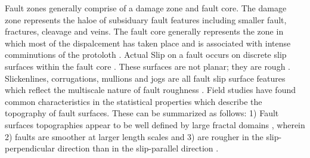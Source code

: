 \documentclass[12pt,a4paper]{article}
\begin{document}
	Fault zones generally comprise of a damage zone and fault core. The damage zone represents the haloe of subsiduary fault features including smaller fault, fractures, cleavage and veins. The fault core generally represents the zone in which most of the dispalcement has taken place and is associated with intense comminutions of the protoloth  \cite{sibson1977fault, chester1986implications, caine1996fault}. Actual Slip on a fault occurs on discrete slip surfaces within the fault core \cite{palmer1973growth, engelder1974cataclasis, aydin1978development, sibson2003thick}. These surfaces are not planar; they are rough \cite{scholz1986fractal}. Slickenlines, corrugations, mullions and jogs are all fault slip surface features which reflect the multiscale nature of fault roughness \cite{scholz1986fractal,sagy2009geometric}. Field studies have found common characteristics in the statistical properties which describe the topography of fault surfaces. These can be summarized as follows: 1) Fault surfaces topographies appear to be well defined by large fractal domains \cite{scholz1986fractal} , wherein 2) faults are smoother at larger length scales  \cite{schmittbuhl1993field, andela2012roughness} and 3) are rougher in the slip-perpendicular direction than in the slip-parallel direction \cite{schmittbuhl1993field, lee1996structural}.
	
\end{document}
